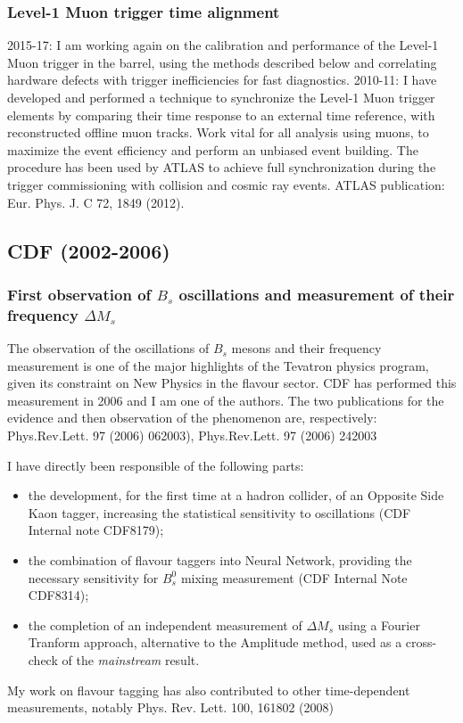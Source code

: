\documentclass{article}
\begin{document}
\begin{vita}
\subsubsection*{Level-1 Muon trigger time alignment}
2015-17: I am working again on the calibration and performance of the Level-1 Muon trigger in the barrel, using the methods described below and correlating hardware defects with trigger inefficiencies for fast diagnostics.
2010-11: I have developed and performed a technique to synchronize the Level-1 Muon trigger elements by comparing their time response to an external time reference,  with reconstructed offline muon tracks. Work vital for all analysis using muons, to maximize the event efficiency and perform an unbiased event building. The procedure has been used by ATLAS to achieve full synchronization during the trigger commissioning with collision and cosmic ray events. ATLAS publication: Eur. Phys. J. C 72, 1849 (2012). 

\subsection*{CDF (2002-2006)}
\subsubsection*{First observation of $B_{s}$ oscillations and measurement of their frequency $\Delta M_{s}$}
The observation of the oscillations of $B_{s}$ mesons and their frequency measurement is one of the major 
highlights of the Tevatron physics program, given its constraint on New Physics in the flavour sector. 
CDF has performed this measurement in 2006 and I am one of the authors. The two publications for the evidence and then observation of the phenomenon are, respectively: Phys.Rev.Lett. 97 (2006) 062003), Phys.Rev.Lett. 97 (2006) 242003

I have directly been responsible of the following parts: 
\begin{itemize}
\item the development, for the first time at a hadron collider, of an Opposite Side Kaon tagger, 
increasing the statistical sensitivity 
to oscillations (CDF Internal note CDF8179);
\item the combination of flavour taggers into Neural Network, providing the necessary 
sensitivity for $B_{s}^{0}$ mixing measurement (CDF Internal Note CDF8314);
\item the completion of an independent measurement of $\Delta M_{s}$ using a Fourier Tranform approach, alternative to the Amplitude method, 
used as a cross-check of the {\it mainstream} result.
\end{itemize}
My work on flavour tagging has also contributed to other time-dependent measurements, notably Phys. Rev. Lett. 100, 161802 (2008)



\end{vita}
\end{document}
